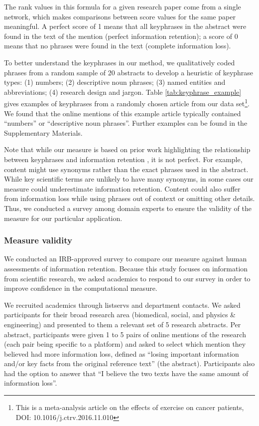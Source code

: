 \documentclass[letterpaper]{article} %
\begin{document}
The rank values in this formula for a given research paper come from a single network, which makes comparisons between score values for the same paper meaningful. A perfect score of 1 means that all keyphrases in the abstract were found in the text of the mention (perfect information retention); a score of 0 means that no phrases were found in the text (complete information loss).

To better understand the keyphrases in our method, we qualitatively coded phrases from a random sample of 20 abstracts to develop a heuristic of keyphrase types: (1) numbers; (2) descriptive noun phrases; (3) named entities and abbreviations; (4) research design and jargon. Table \ref{tab:keyphrase_example} gives examples of keyphrases from a randomly chosen article from our data set\footnote{This is a meta-analysis article on the effects of exercise on cancer patients, DOI: 10.1016/j.ctrv.2016.11.010}. We found that the online mentions of this example article typically contained ``numbers'' or ``descriptive noun phrases''. Further examples can be found in the Supplementary Materials.

Note that while our measure is based on prior work highlighting the relationship between keyphrases and information retention \cite{ribeiroMessageDistortionInformation2019}, it is not perfect. For example, content might use synonyms rather than the exact phrases used in the abstract. While key scientific terms are unlikely to have many synonyms, in some cases our measure could underestimate information retention. Content could also suffer from information loss while using phrases out of context or omitting other details. Thus, we conducted a survey among domain experts to ensure the validity of the measure for our particular application.

\subsubsection{Measure validity}
We conducted an IRB-approved survey to compare our measure against human assessments of information retention. Because this study focuses on information from scientific research, we asked academics to respond to our survey in order to improve confidence in the computational measure.

We recruited academics through listservs and department contacts. We asked participants for their broad research area (biomedical, social, and physics \& engineering) and presented to them a relevant set of 5 research abstracts. Per abstract, participants were given 1 to 5 pairs of online mentions of the research (each pair being specific to a platform) and asked to select which mention they believed had more information loss, defined as ``losing important information and/or key facts from the original reference text'' (the abstract). Participants also had the option to answer that ``I believe the two texts have the same amount of information loss''.
\end{document}
